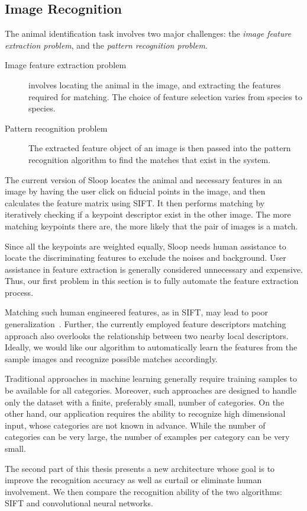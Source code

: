 \subsection{Image Recognition} %
\label{sub:image_recognition}

The animal identification task involves two major challenges: the \emph{image
feature extraction problem}, and the \emph{pattern recognition problem}.
\begin{description}
    \item[Image feature extraction problem] involves locating the animal in the
    image, and extracting the features required for matching. The choice of
    feature selection varies from species to species.

    \item[Pattern recognition problem] The extracted feature object of an image
    is then passed into the pattern recognition algorithm to find the matches
    that exist in the system.
\end{description}

The current version of Sloop locates the animal and necessary features in an
image by having the user click on fiducial points in the image, and then
calculates the feature matrix using SIFT\@. It then performs matching by
iteratively checking if a keypoint descriptor exist in the other image.  The
more matching keypoints there are, the more likely that the pair of images is a
match.

Since all the keypoints are weighted equally, Sloop needs human assistance to
locate the discriminating features to exclude the noises and background. User
assistance in feature extraction is generally considered unnecessary and
expensive.  Thus, our first problem in this section is to fully automate the
feature extraction process. 

Matching such human engineered features, as in SIFT, may lead to poor
generalization~\cite{fisher14}.  Further, the currently employed feature
descriptors matching approach also overlooks the relationship between two
nearby local descriptors. Ideally, we would like our algorithm to automatically
learn the features from the sample images and recognize possible matches
accordingly.

Traditional approaches in machine learning generally require training samples
to be available for all categories. Moreover, such approaches are designed to
handle only the dataset with a finite, preferably small, number of categories.
On the other hand, our application requires the ability to recognize high
dimensional input, whose categories are not known in advance. While the number
of categories can be very large, the number of examples per category can be
very small.

The second part of this thesis presents a new architecture whose goal is to
improve the recognition accuracy as well as curtail or eliminate human
involvement. We then compare the recognition ability of the two algorithms:
SIFT and convolutional neural networks.
